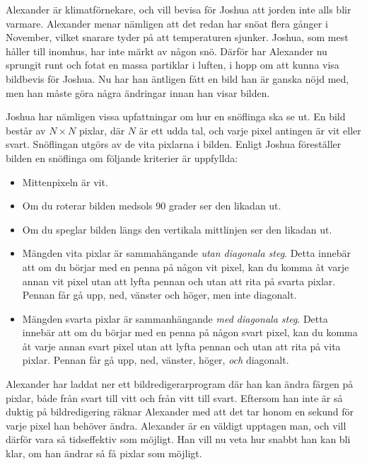 
Alexander är klimatförnekare, och vill bevisa för Joshua att jorden inte alls blir varmare. 
Alexander menar nämligen att det redan har snöat flera gånger i November, 
vilket snarare tyder på att temperaturen sjunker. Joshua, som mest håller till inomhus, 
har inte märkt av någon snö. 
Därför har Alexander nu sprungit runt och fotat en massa partiklar i luften, 
i hopp om att kunna visa bildbevis för Joshua. 
Nu har han äntligen fått en bild han är ganska nöjd med, 
men han måste göra några ändringar innan han visar bilden. 

Joshua har nämligen vissa upfattningar om hur en snöflinga ska se ut.
En bild består av $N \times N$ pixlar, där $N$ är ett udda tal, och varje pixel antingen är vit eller svart.
Snöflingan utgörs av de vita pixlarna i bilden.
Enligt Joshua föreställer bilden en snöflinga om följande kriterier är uppfyllda:

\begin{itemize}
  \item Mittenpixeln är vit.
  \item Om du roterar bilden medsols 90 grader ser den likadan ut.
  \item Om du speglar bilden längs den vertikala mittlinjen ser den likadan ut.
  \item Mängden vita pixlar är sammahängande \emph{utan diagonala steg}. 
    Detta innebär att om du börjar med en penna på någon vit pixel, kan 
    du komma åt varje annan vit pixel utan att lyfta pennan och utan
    att rita på svarta pixlar.
    Pennan får gå upp, ned, vänster och höger, men inte diagonalt.
  \item Mängden svarta pixlar är sammanhängande \emph{med diagonala steg}.
    Detta innebär att om du börjar med en penna på någon svart pixel, kan 
    du komma åt varje annan svart pixel utan att lyfta pennan och utan
    att rita på vita pixlar.
    Pennan får gå upp, ned, vänster, höger, \emph{och} diagonalt.
\end{itemize}
Alexander har laddat ner ett bildredigerarprogram där han kan ändra färgen på pixlar, både från svart till vitt och från vitt till svart. 
Eftersom han inte är så duktig på bildredigering räknar Alexander med att det tar honom en sekund för varje pixel han behöver ändra.
Alexander är en väldigt upptagen man, och vill därför vara så tidseffektiv som möjligt.
Han vill nu veta hur snabbt han kan bli klar, om han ändrar så få pixlar som möjligt. 

